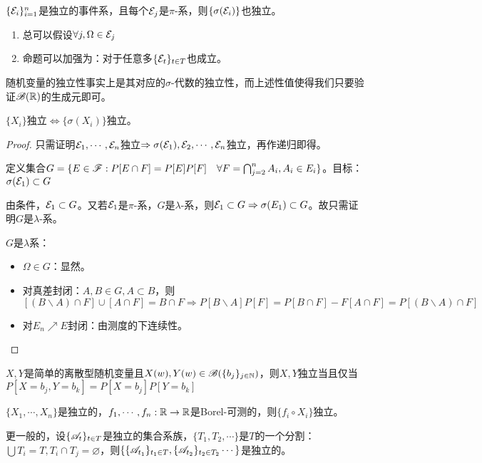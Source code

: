 \documentclass{ctexart}
\begin{document}
\begin{Prop}
  $\{\mathcal{E}_{i}\}_{i=1}^{n}$是独立的事件系，且每个$\mathcal{E}_{j}$是$\pi$-系，则$\{\sigma(\mathcal{E}_{i})\}$也独立。
\end{Prop}

\begin{Rmk}
  \begin{enumerate}
  \item 总可以假设$\forall j,\Omega\in \mathcal{E}_{j}$
  \item 命题可以加强为：对于任意多$\{\mathcal{E}_{t}\}_{t\in T}$也成立。
  \end{enumerate}
\end{Rmk}

随机变量的独立性事实上是其对应的$\sigma$-代数的独立性，而上述性值使得我们只要验证$\mathscr{B}(\mathbb{R})$的生成元即可。

\begin{Cor}
  $\{X_{i}\}$独立$\Leftrightarrow \{\sigma(X_{i})\}$独立。
\end{Cor}

\begin{proof}
  只需证明$\mathcal{E}_{1},\cdots,\mathcal{E}_{n}$独立$\Rightarrow \sigma(\mathcal{E}_{1}),\mathcal{E}_{2},\cdots,\mathcal{E}_{n}$独立，再作递归即得。

  定义集合$G=\{E\in\mathscr{F}:P[E\cap F]=P[E]P[F]\quad\forall F=\bigcap_{j=2}^{n}A_{i},A_{i}\in E_{i}\}$。目标：$\sigma(\mathcal{E}_{1})\subset G$

  由条件，$\mathcal{E}_{1}\subset G$。又若$\mathcal{E}_{1}$是$\pi$-系，$G$是$\lambda$-系，则$\mathcal{E}_{1}\subset G\Rightarrow \sigma(E_{1})\subset G$。故只需证明$G$是$\lambda$-系。

  $G$是$\lambda$系：
  \begin{itemize}
  \item $\Omega\in G$：显然。
  \item 对真差封闭：$A,B\in G,A\subset B$，则$[(B\backslash A)\cap F]\cup[A\cap F]=B\cap F\Rightarrow P[B\backslash A]P[F]=P[B\cap F]-F[A\cap F]=P[(B\backslash A)\cap F]$
  \item 对$E_{n}\nearrow E$封闭：由测度的下连续性。
  \end{itemize}
\end{proof}

\begin{Eg}
  $X,Y$是简单的离散型随机变量且$X(w),Y(w)\in \mathscr{B}(\{b_{j}\}_{j\in\mathbb{N}})$，则$X,Y$独立当且仅当$P[X=b_{j},Y=b_{k}]=P[X=b_{j}]P[Y=b_{k}]$
\end{Eg}

\begin{Eg}
  $\{X_{1},\cdots,X_{n}\}$是独立的，$f_{1},\cdots,f_{n}:\mathbb{R}\to\mathbb{R}$是Borel-可测的，则$\{f_{i}\circ X_{i}\}$独立。

  更一般的，设$\{\mathscr{A}_{t}\}_{t\in T}$是独立的集合系族，$\{T_{1},T_{2},\cdots\}$是$T$的一个分割：$\bigcup T_{i}=T,T_{i}\cap T_{j}=\varnothing$，则$\{\{\mathscr{A}_{t_{1}}\}_{t_{1}\in T},\{\mathscr{A}_{t_{2}}\}_{t_{2}\in T_{2}}\cdots\}$是独立的。
\end{Eg}
\end{document}
